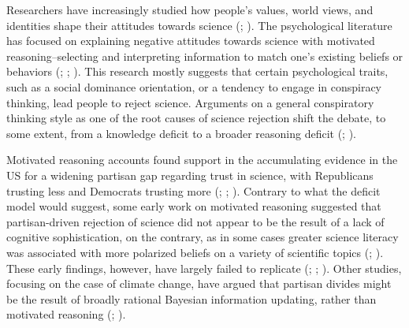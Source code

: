 \documentclass[
  jou,
  floatsintext,
  longtable,
  nolmodern,
  notxfonts,
  notimes,
  colorlinks=true,linkcolor=blue,citecolor=blue,urlcolor=blue]{apa7}
\begin{document}
Researchers have increasingly studied how people's values, world views,
and identities shape their attitudes towards science
(;
). The psychological literature has focused on
explaining negative attitudes towards science with motivated
reasoning--selecting and interpreting information to match one's
existing beliefs or behaviors
(;
;
). This research mostly suggests that certain
psychological traits, such as a social dominance orientation, or a
tendency to engage in conspiracy thinking, lead people to reject
science. Arguments on a general conspiratory thinking style as one of
the root causes of science rejection shift the debate, to some extent,
from a knowledge deficit to a broader reasoning deficit
(;
).

Motivated reasoning accounts found support in the accumulating evidence
in the US for a widening partisan gap regarding trust in science, with
Republicans trusting less and Democrats trusting more
(;
;
). Contrary to
what the deficit model would suggest, some early work on motivated
reasoning suggested that partisan-driven rejection of science did not
appear to be the result of a lack of cognitive sophistication, on the
contrary, as in some cases greater science literacy was associated with
more polarized beliefs on a variety of scientific topics
(; ). These early findings, however, have largely failed to
replicate
(;
; ). Other studies, focusing on the case of climate change,
have argued that partisan divides might be the result of broadly
rational Bayesian information updating, rather than motivated reasoning
(; ).
\end{document}
